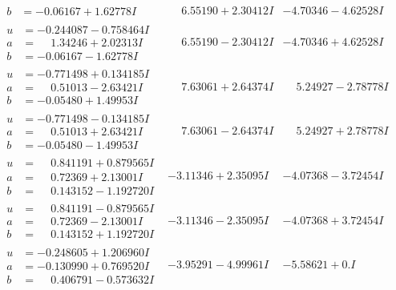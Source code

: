 \documentclass[1p]{elsarticle_modified}
\theoremstyle{definition}
\begin{document}
$$\begin{array}{c|c|c}
\begin{aligned}
b &= -0.06167 + 1.62778 I\end{aligned}
 & \phantom{-}6.55190 + 2.30412 I & -4.70346 - 4.62528 I \\ \hline\begin{aligned}
u &= -0.244087 - 0.758464 I \\
a &= \phantom{-}1.34246 + 2.02313 I \\
b &= -0.06167 - 1.62778 I\end{aligned}
 & \phantom{-}6.55190 - 2.30412 I & -4.70346 + 4.62528 I \\ \hline\begin{aligned}
u &= -0.771498 + 0.134185 I \\
a &= \phantom{-}0.51013 - 2.63421 I \\
b &= -0.05480 + 1.49953 I\end{aligned}
 & \phantom{-}7.63061 + 2.64374 I & \phantom{-}5.24927 - 2.78778 I \\ \hline\begin{aligned}
u &= -0.771498 - 0.134185 I \\
a &= \phantom{-}0.51013 + 2.63421 I \\
b &= -0.05480 - 1.49953 I\end{aligned}
 & \phantom{-}7.63061 - 2.64374 I & \phantom{-}5.24927 + 2.78778 I \\ \hline\begin{aligned}
u &= \phantom{-}0.841191 + 0.879565 I \\
a &= \phantom{-}0.72369 + 2.13001 I \\
b &= \phantom{-}0.143152 - 1.192720 I\end{aligned}
 & -3.11346 + 2.35095 I & -4.07368 - 3.72454 I \\ \hline\begin{aligned}
u &= \phantom{-}0.841191 - 0.879565 I \\
a &= \phantom{-}0.72369 - 2.13001 I \\
b &= \phantom{-}0.143152 + 1.192720 I\end{aligned}
 & -3.11346 - 2.35095 I & -4.07368 + 3.72454 I \\ \hline\begin{aligned}
u &= -0.248605 + 1.206960 I \\
a &= -0.130990 + 0.769520 I \\
b &= \phantom{-}0.406791 - 0.573632 I\end{aligned}
 & -3.95291 - 4.99961 I & -5.58621 + 0. I\phantom{ +0.000000I} \\ \hline\begin{aligned}

\end{aligned}
\end{array}$$
\end{document}
